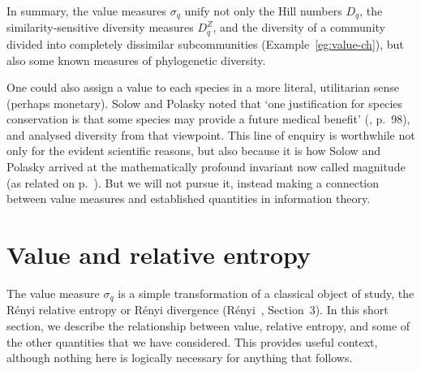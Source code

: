 In summary, the value measures $\sigma_q$ unify not only the Hill numbers
$D_q$, the similarity-sensitive diversity measures $D_q^Z$, and the
diversity of a community divided into completely dissimilar subcommunities
(Example~\ref{eg:value-ch}), but also some known measures of phylogenetic
diversity.

One could also assign a value to each species in a more literal,
utilitarian sense (perhaps
monetary).%
%
%
%
% 
Solow%
%
%
and
Polasky%
%
% 
noted that `one justification for species
conservation is that some species may provide a future
medical benefit' (\cite{SoPo}, p.~98), and analysed diversity from that
viewpoint.  This line of enquiry is worthwhile not only for the evident
scientific reasons, but also because it is how Solow and Polasky arrived at
the mathematically profound invariant now called magnitude (as related on
p.~\pageref{p:sp-mag}).  But we will not pursue it, instead making a
connection between value measures and established quantities in information
theory.


\section{Value and relative entropy}


The value measure $\sigma_q$ is a simple transformation of a classical
object of study, the R\'enyi relative entropy or R\'enyi divergence
(R\'enyi~\cite{Reny}, Section~3).  In this short section, we describe the
relationship between value, relative entropy, and some of the other
quantities that we have considered.  This provides useful context, although
nothing here is logically necessary for anything that follows.

